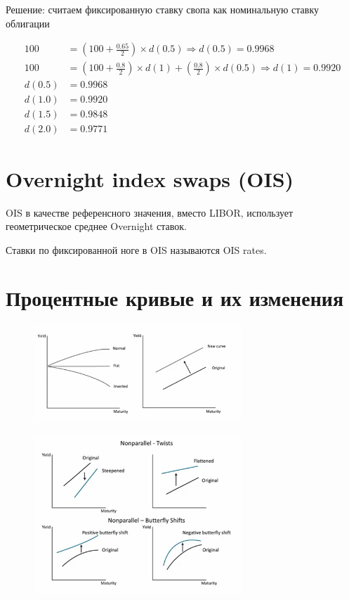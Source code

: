 \documentclass{article}
\begin{document}
Решение: считаем фиксированную ставку свопа как номинальную ставку облигации

\begin{align*}
    100 &= (100 + \frac{0.65}{2})\times d(0.5) \Rightarrow d(0.5) = 0.9968
    \\
    100 &= (100 + \frac{0.8}{2})\times d(1)+(\frac{0.8}{2})\times d(0.5) \Rightarrow d(1) = 0.9920
    \\
    d(0.5) &= 0.9968
    \\
    d(1.0) &= 0.9920
    \\
    d(1.5) &= 0.9848
    \\
    d(2.0) &= 0.9771
\end{align*}

\section{Overnight index swaps (OIS)}

OIS в качестве референсного значения, вместо LIBOR, использует геометрическое среднее Overnight ставок.

Ставки по фиксированной ноге в OIS называются OIS rates.



\section{Процентные кривые и их изменения}

\begin{figure}[h]
    \centering
    \includegraphics[width=0.7\textwidth]{7.png}
\end{figure}

\begin{figure}[h]
    \centering
    \includegraphics[width=0.7\textwidth]{8.png}
\end{figure}
\end{document}
